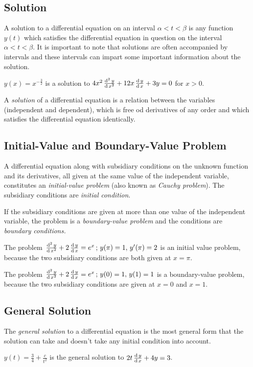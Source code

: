 \documentclass[12pt,oneside,a4paper]{article}
\begin{document}
\subsection{Solution}
A solution to a differential equation on an interval $ \alpha < t <\beta $ is any function $ y(t) $ which satisfies the differential equation in question on the interval $ \alpha < t <\beta $. It is important to note that solutions are often accompanied by intervals and these intervals can impart some important information about the solution.
\begin{ex}
    $ y(x)=x^{-\frac{3}{2}} $ is a solution to $ 4x^2\,\frac{\mathrm{d}^{2}\, y}{\mathrm{d}\, x^{2}}+12x\,\frac{\mathrm{d}\,y}{\mathrm{d}\,x}+3y=0 $ for $ x>0 $.
\end{ex}

A \emph{solution} of a differential equation is a relation between the variables (independent and dependent), which is free od derivatives of any order and which satisfies the differential equation identically. 
\subsection{Initial-Value and Boundary-Value Problem}
A differential equation along with subsidiary conditions on the unknown function and its derivatives, all given at the same value of the independent variable, constitutes an \emph{initial-value problem} (also known as \emph{Cauchy problem}). The subsidiary conditions are \emph{initial condition}.

If the subsidiary conditions are given at more than one value of the independent variable, the problem is a \emph{boundary-value problem} and the conditions are \emph{boundary conditions.}
\begin{ex}
    The problem $ \,\frac{\mathrm{d}^{2}\, y}{\mathrm{d}\, x^{2}}+2\,\frac{\mathrm{d}\,y}{\mathrm{d}\,x}=e^x\,;\, y(\pi)=1,\,y'(\pi)=2 $ is an initial value problem, because the two subsidiary conditions are both given at $ x=\pi $.

    The problem $  \,\frac{\mathrm{d}^{2}\, y}{\mathrm{d}\, x^{2}}+2\,\frac{\mathrm{d}\,y}{\mathrm{d}\,x}=e^x\,;\, y(0)=1,\,y(1)=1 $ is a boundary-value problem, because the two subsidiary conditions are given at $ x=0 $ and $ x=1 $.
\end{ex}
\subsection{General Solution}
The \emph{general solution} to a differential equation is the most general form that the solution can take and doesn't take any initial condition into account.
\begin{ex}
    $ y(t)=\frac{3}{4}+\frac{c}{t^2} $ is the general solution to $ 2t\,\frac{\mathrm{d}\,y}{\mathrm{d}\,x}+4y=3 $.
\end{ex}
\end{document}
